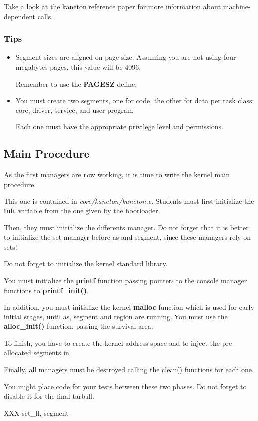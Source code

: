 Take a look at the kaneton reference paper for more information about
machine-dependent calls.

\subsubsection{Tips}

\begin{itemize}
  \item
    Segment sizes are aligned on page size. Assuming you are not using
    four megabytes pages, this value will be 4096.

    Remember to use the \textbf{PAGESZ} define.
  \item
    You must create two segments, one for code, the other for data
    per task class: core, driver, service, and user program.

    Each one must have the appropriate privilege level and permissions.
\end{itemize}

%
%

\subsection{Main Procedure}

As the first managers are now working, it is time to write the kernel
main procedure.

This  one is  contained in \textit{core/kaneton/kaneton.c}. Students
must first initialize the \textbf{init} variable from the one given by
the bootloader.

Then, they  must initialize the differents manager. Do not forget that
it is better to initialize the set manager before as and segment,
since these managers rely on sets!

Do not forget to initialize the kernel standard library.

You must initialize the \textbf{printf} function passing pointers to the
console manager functions to \textbf{printf\_init()}.

In addition, you must initialize the kernel \textbf{malloc} function which
is used for early initial stages, until as, segment and region are running.
You must use the \textbf{alloc\_init()} function, passing the survival area.

To finish, you  have to create the kernel address space and to inject
the pre-allocated segments in.

Finally, all managers must be destroyed calling the clean() functions for
each one.

You might place code for your tests between these two phases. Do not
forget to disable it for the final tarball.

XXX set\_ll, segment
